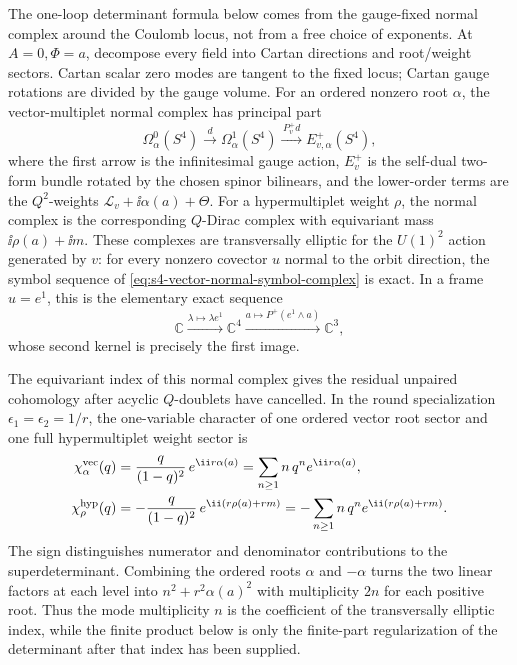 The one-loop determinant formula below comes from the gauge-fixed normal
complex around the Coulomb locus, not from a free choice of exponents.  At
\(A=0,\Phi=a\), decompose every field into Cartan directions and
root/weight sectors.  Cartan scalar zero modes are tangent to the fixed locus;
Cartan gauge rotations are divided by the gauge volume.  For an ordered
nonzero root \(\alpha\), the vector-multiplet normal complex has principal
part
\begin{equation}
  \Omega^0_\alpha(S^4)
  \xrightarrow{\,d\,}
  \Omega^1_\alpha(S^4)
  \xrightarrow{\,P_v^+d\,}
  E^+_{v,\alpha}(S^4),
  \label{eq:s4-vector-normal-symbol-complex}
\end{equation}
where the first arrow is the infinitesimal gauge action, \(E_v^+\) is the
self-dual two-form bundle rotated by the chosen spinor bilinears, and the
lower-order terms are the \(Q^2\)-weights
\(\mathcal L_v+\ii\alpha(a)+\Theta\).  For a hypermultiplet weight \(\rho\),
the normal complex is the corresponding \(Q\)-Dirac complex with equivariant
mass \(\ii\rho(a)+\ii m\).  These complexes are transversally elliptic for the
\(U(1)^2\) action generated by \(v\): for every nonzero covector \(u\) normal
to the orbit direction, the symbol sequence of
\eqref{eq:s4-vector-normal-symbol-complex} is exact.  In a frame
\(u=e^1\), this is the elementary exact sequence
\[
  \mathbb C
  \xrightarrow{\lambda\mapsto\lambda e^1}
  \mathbb C^4
  \xrightarrow{a\mapsto P^+(e^1\wedge a)}
  \mathbb C^3,
\]
whose second kernel is precisely the first image.

The equivariant index of this normal complex gives the residual unpaired
cohomology after acyclic \(Q\)-doublets have cancelled.  In the round
specialization \(\epsilon_1=\epsilon_2=1/r\), the one-variable character of one
ordered vector root sector and one full hypermultiplet weight sector is
\begin{equation}
\begin{aligned}
  \chi_{\alpha}^{\rm vec}(q)
  &=
  \frac{q}{(1-q)^2}\,e^{\ii r\alpha(a)}
  =
  \sum_{n\ge1}n\,q^n e^{\ii r\alpha(a)},\\
  \chi_{\rho}^{\rm hyp}(q)
  &=
  -\frac{q}{(1-q)^2}\,e^{\ii(r\rho(a)+rm)}
  =
  -\sum_{n\ge1}n\,q^n e^{\ii(r\rho(a)+rm)} .
\end{aligned}
  \label{eq:s4-normal-complex-index-multiplicities}
\end{equation}
The sign distinguishes numerator and denominator contributions to the
superdeterminant.  Combining the ordered roots \(\alpha\) and \(-\alpha\)
turns the two linear factors at each level into \(n^2+r^2\alpha(a)^2\) with
multiplicity \(2n\) for each positive root.  Thus the mode multiplicity \(n\)
is the coefficient of the transversally elliptic index, while the finite
product below is only the finite-part regularization of the determinant after
that index has been supplied.

